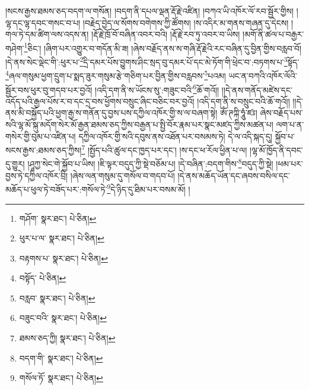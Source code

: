 །སངས་རྒྱས་ཐམས་ཅད་བདག་ལ་གསོན། །བདག་ནི་དཔལ་ལྡན་རྡོ་རྗེ་འཛིན། །བཀའ་ཡི་འཁོར་ལོ་རབ་སྦྱོར་གྱིས། །ལྷ་དང་ལྷ་དབང་གསང་བ་པ། །བརྗེད་བྱེད་ལ་སོགས་བགེགས་ཀྱི་ཚོགས། །ས་འདིར་མ་གནས་གཞན་དུ་དེངས། །གལ་ཏེ་དམ་ཚིག་ལས་འདས་ན། །རྡོ་རྗེ་ཁྲོ་བོ་བཞིན་འབར་བའི། །རྡོ་རྗེ་རབ་ཏུ་འབར་བ་ཡིས། །མགོ་ནི་ཚལ་པ་བརྒྱར་གཤེག་\footnote{གཤོག་  སྣར་ཐང་།  པེ་ཅིན། }ཅིང་། །ཞིག་པར་འགྱུར་བ་གདོན་མི་ཟ། །ཞེས་བརྗོད་ནས་ས་གཞི་རྡོ་རྗེའི་རང་བཞིན་དུ་བྱིན་གྱིས་བརླབ་བོ། །དེ་ནས་སེང་ལྡེང་གི་:ཕུར་པ་\footnote{ཕུར་པ་ལ་  སྣར་ཐང་།  པེ་ཅིན། }དྲི་དམར་པོས་བྱུགས་ཤིང་སྲད་བུ་དམར་པོ་དང་མེ་ཏོག་གི་ཕྲེང་བ་:བཏགས་པ་\footnote{བརྟགས་པ་  སྣར་ཐང་།  པེ་ཅིན། }སྟོད་\footnote{བསྟོད་  པེ་ཅིན། }ཞལ་གསུམ་ཕྱག་དྲུག་པ་སྨད་ཟུར་གསུམ་རྩེ་གཅིག་པར་བྱིན་གྱིས་བརླབས་\footnote{བརླབ་  སྣར་ཐང་།  པེ་ཅིན། }པའམ། ཡང་ན་བཀའི་འཁོར་ལོའི་སྦྱོར་བས་ཕུར་བུ་གདབ་པར་བྱའོ། །འདི་དག་ནི་ས་ཡོངས་སུ་:གཟུང་བའི་\footnote{བཟུང་བའི་  སྣར་ཐང་།  པེ་ཅིན། }ཆོ་གའོ།། །།དེ་ནས་གནོད་མཛེས་དང་འདོད་པའི་རྒྱལ་པོས་ར་བ་དང་དྲ་བས་ཕྱོགས་བསྲུང་ཞིང་བཅིང་བར་བྱའོ། །འདི་དག་ནི་ས་བསྲུང་བའི་ཆོ་གའོ།། །།དེ་ནས་མི་བསྐྱོད་པའི་ཕྱག་རྒྱ་ས་གནོན་དུ་བྱས་པས་དཀྱིལ་འཁོར་གྱི་ས་ལ་བཞག་སྟེ། ཨོཾ་ཊཀྐི་ཧཱུཾ་ཛཿ། ཞེས་བརྗོད་པས་སའི་ལྷ་མོ་སྐུ་མདོག་སེར་མོ་རྒྱན་ཐམས་ཅད་ཀྱིས་བརྒྱན་པ་སྤྱི་བོར་རྣམ་པར་སྣང་མཛད་ཀྱིས་མཚན་པ། ལག་པ་ན་གསེར་གྱི་བུམ་པ་འཛིན་པ། དཀྱིལ་འཁོར་གྱི་སའི་དབུས་ནས་འཐོན་པར་བསམས་ཏེ། དེ་ལ་འདི་སྐད་དུ། སྐྱོབ་པ་སངས་རྒྱས་:ཐམས་ཅད་ཀྱིས།\footnote{ཐམས་ཅད་ཀྱི།  སྣར་ཐང་།  པེ་ཅིན། } །སྤྱོད་པའི་ཚུལ་དང་ཁྱད་པར་དང་། །ས་དང་ཕ་རོལ་ཕྱིན་པ་ལ། །ལྷ་མོ་ཁྱོད་ནི་དབང་དུ་གྱུར། །ཤཱཀྱ་སེང་གེ་སྐྱོབ་པ་ཡིས། །ཇི་ལྟར་བདུད་ཀྱི་སྡེ་བཅོམ་པ། །དེ་བཞིན་:བདག་གིས་\footnote{བདག་གི་  སྣར་ཐང་།  པེ་ཅིན། }བདུད་ཀྱི་སྡེ། །ཕམ་པར་བྱས་ཏེ་དཀྱིལ་འཁོར་བྲི། །ཞེས་ལན་གསུམ་དུ་གསོལ་བ་གདབ་པོ། །དེ་ནས་མཆོད་ཡོན་དང་ཞབས་བསིལ་དང་མཆོད་པ་ཕུལ་ཏེ་བཟོད་པར་:གསོལ་ཏེ་\footnote{གསོལ་ཏོ་  སྣར་ཐང་།  པེ་ཅིན། }དེ་ཉིད་དུ་ཐིམ་པར་བསམ་མོ། །
